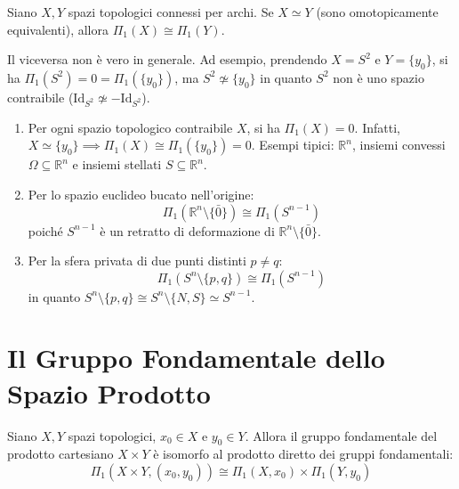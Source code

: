 \begin{coro}
Siano $X, Y$ spazi topologici connessi per archi. Se $X \simeq Y$ (sono omotopicamente equivalenti), allora $\Pi_1(X) \cong \Pi_1(Y)$.
\end{coro}

\begin{observacion}
Il viceversa non è vero in generale. Ad esempio, prendendo $X = S^2$ e $Y = \{y_0\}$, si ha $\Pi_1(S^2) = 0 = \Pi_1(\{y_0\})$, ma $S^2 \not\simeq \{y_0\}$ in quanto $S^2$ non è uno spazio contraibile ($\mathrm{Id}_{S^2} \not\simeq -\mathrm{Id}_{S^2}$).
\end{observacion}

\vspace{1.5em}

\begin{ejemplo}
\begin{enumerate}
    \item Per ogni spazio topologico contraibile $X$, si ha $\Pi_1(X) = 0$.
    Infatti, $X \simeq \{y_0\} \implies \Pi_1(X) \cong \Pi_1(\{y_0\}) = 0$.
    Esempi tipici: $\mathbb{R}^n$, insiemi convessi $\Omega \subseteq \mathbb{R}^n$ e insiemi stellati $S \subseteq \mathbb{R}^n$.

    \item Per lo spazio euclideo bucato nell'origine:
    \[
    \Pi_1(\mathbb{R}^n \setminus \{\bar{0}\}) \cong \Pi_1(S^{n-1})
    \]
    poiché $S^{n-1}$ è un retratto di deformazione di $\mathbb{R}^n \setminus \{\bar{0}\}$.

    \item Per la sfera privata di due punti distinti $p \neq q$:
    \[
    \Pi_1(S^n \setminus \{p,q\}) \cong \Pi_1(S^{n-1})
    \]
    in quanto $S^n \setminus \{p,q\} \cong S^n \setminus \{N, S\} \simeq S^{n-1}$.
\end{enumerate}
\end{ejemplo}

\section{Il Gruppo Fondamentale dello Spazio Prodotto}

\begin{teo}
Siano $X, Y$ spazi topologici, $x_0 \in X$ e $y_0 \in Y$.
Allora il gruppo fondamentale del prodotto cartesiano $X \times Y$ è isomorfo al prodotto diretto dei gruppi fondamentali:
\[
\Pi_1(X \times Y, (x_0, y_0)) \cong \Pi_1(X, x_0) \times \Pi_1(Y, y_0)
\]
\end{teo}

